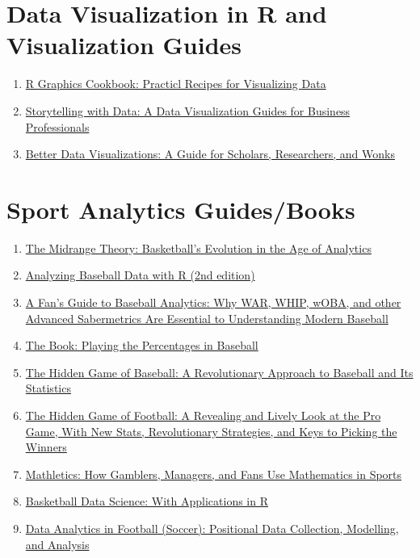 \documentclass[
  letterpaper,
]{krantz}
\begin{document}
\hypertarget{data-visualization-in-r-and-visualization-guides}{%
\section{Data Visualization in R and Visualization
Guides}\label{data-visualization-in-r-and-visualization-guides}}

\begin{enumerate}
\def\labelenumi{\arabic{enumi}.}
\item
  \href{https://amzn.to/3oulxTa}{R Graphics Cookbook: Practicl Recipes
  for Visualizing Data}
\item
  \href{https://amzn.to/3PAOB7y}{Storytelling with Data: A Data
  Visualization Guides for Business Professionals}
\item
  \href{https://amzn.to/3PE3QfP}{Better Data Visualizations: A Guide for
  Scholars, Researchers, and Wonks}
\end{enumerate}

\hypertarget{sport-analytics-guidesbooks}{%
\section{Sport Analytics
Guides/Books}\label{sport-analytics-guidesbooks}}

\begin{enumerate}
\def\labelenumi{\arabic{enumi}.}
\item
  \href{https://amzn.to/3PE2LEK}{The Midrange Theory: Basketball's
  Evolution in the Age of Analytics}
\item
  \href{https://amzn.to/3vgIyNl}{Analyzing Baseball Data with R (2nd
  edition)}
\item
  \href{https://amzn.to/3zwXcCA}{A Fan's Guide to Baseball Analytics:
  Why WAR, WHIP, wOBA, and other Advanced Sabermetrics Are Essential to
  Understanding Modern Baseball}
\item
  \href{https://amzn.to/3vgR3rM}{The Book: Playing the Percentages in
  Baseball}
\item
  \href{https://amzn.to/3oy66t4}{The Hidden Game of Baseball: A
  Revolutionary Approach to Baseball and Its Statistics}
\item
  \href{https://amzn.to/3PZt7kf}{The Hidden Game of Football: A
  Revealing and Lively Look at the Pro Game, With New Stats,
  Revolutionary Strategies, and Keys to Picking the Winners}
\item
  \href{https://amzn.to/3zwXysU}{Mathletics: How Gamblers, Managers, and
  Fans Use Mathematics in Sports}
\item
  \href{https://amzn.to/3Bnd23U}{Basketball Data Science: With
  Applications in R}
\item
  \href{https://amzn.to/3PE4bPA}{Data Analytics in Football (Soccer):
  Positional Data Collection, Modelling, and Analysis}
\end{enumerate}
\end{document}
